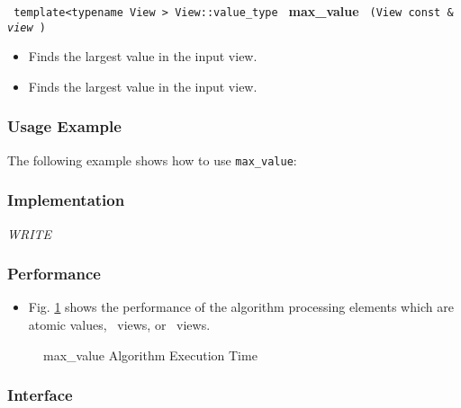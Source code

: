 \noindent
\texttt{%
template<typename View >
\newline
View::value\_type 
}
\newline
\textbf{max\_value}%
\texttt{%
(View const \&
\textit{view}%
)
}

\begin{itemize}
\item
Finds the largest value in the input view. 
\item
Finds the largest value in the input view. 
\end{itemize}

\subsubsection{Usage Example} %

The following example shows how to use \texttt{max\_value}:

 
\subsubsection{Implementation} %

\textit{WRITE}

\subsubsection{Performance} %

\begin{itemize}
\item
Fig. \ref{fig:maxval-alg-exec-exper}
shows the performance of the algorithm processing
elements which are atomic values, \stl\ views, or \stapl\ views.
\end{itemize}

\begin{figure}[p]
\caption{max\_value Algorithm Execution Time}
\label{fig:maxval-alg-exec-exper}
\end{figure}

 
\subsubsection{Interface} %

